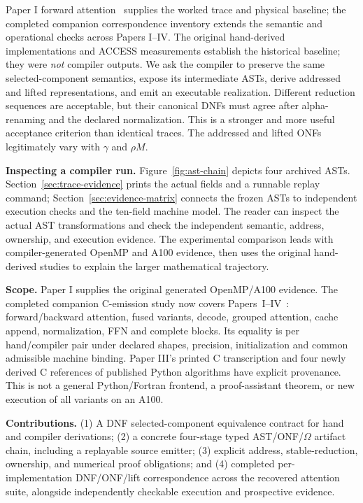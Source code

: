 \documentclass[sigplan,10pt,review,balance=false,pbalance=false]{acmart}
\begin{document}
Paper I forward attention~\cite{paperI} supplies the worked trace and physical baseline; the completed companion correspondence inventory extends the semantic and operational checks across Papers I--IV. The original hand-derived implementations and ACCESS measurements establish the historical baseline; they were \emph{not} compiler outputs. We ask the compiler to preserve the same selected-component semantics, expose its intermediate ASTs, derive addressed and lifted representations, and emit an executable realization. Different reduction sequences are acceptable, but their canonical DNFs must agree after alpha-renaming and the declared normalization. This is a stronger and more useful acceptance criterion than identical traces. The addressed and lifted ONFs legitimately vary with $\gamma$ and $\rho M$.

\textbf{Inspecting a compiler run.} Figure~\ref{fig:ast-chain} depicts four archived ASTs. Section~\ref{sec:trace-evidence} prints the actual fields and a runnable replay command; Section~\ref{sec:evidence-matrix} connects the frozen ASTs to independent execution checks and the ten-field machine model. The reader can inspect the actual AST transformations and check the independent semantic, address, ownership, and execution evidence. The experimental comparison leads with compiler-generated OpenMP and A100 evidence, then uses the original hand-derived studies to explain the larger mathematical trajectory.

\textbf{Scope.} Paper I supplies the original generated OpenMP/A100 evidence. The completed companion C-emission study now covers Papers~I--IV~\cite{paperI,paperII,paperIII,paperIV}: forward/backward attention, fused variants, decode, grouped attention, cache append, normalization, FFN and complete blocks. Its equality is per hand/compiler pair under declared shapes, precision, initialization and common admissible machine binding. Paper III's printed C transcription and four newly derived C references of published Python algorithms have explicit provenance. This is not a general Python/Fortran frontend, a proof-assistant theorem, or new execution of all variants on an A100.

\textbf{Contributions.} (1) A DNF selected-component equivalence contract for hand and compiler derivations; (2) a concrete four-stage typed AST/ONF/$\Omega$ artifact chain, including a replayable source emitter; (3) explicit address, stable-reduction, ownership, and numerical proof obligations; and (4) completed per-implementation DNF/ONF/lift correspondence across the recovered attention suite, alongside independently checkable execution and prospective evidence.
\end{document}
